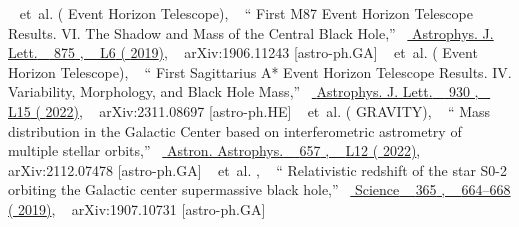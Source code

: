 \documentclass[aps,reprint,superscriptaddress,nofootinbib,floatfix,longbibliography,preprintnumbers]{revtex4-1}
\begin{document}
\begin{thebibliography}{139}
  \BibitemOpen
   { { \  }  et~al.  ( {Event Horizon Telescope}), \  } {\enquote { {{First M87 Event Horizon Telescope Results. VI. The Shadow and Mass of the Central Black Hole}},} \  }\href {\doibase 10.3847/2041-8213/ab1141} { { {Astrophys. J. Lett.} \  }  {875} , \   {L6} ( {2019}{})}, \   {arXiv:1906.11243 [astro-ph.GA]} 
  \BibitemOpen
   { { \  }  et~al.  ( {Event Horizon Telescope}), \  } {\enquote { {{First Sagittarius A* Event Horizon Telescope Results. IV. Variability, Morphology, and Black Hole Mass}},} \  }\href {\doibase 10.3847/2041-8213/ac6736} { { {Astrophys. J. Lett.} \  }  {930} , \   {L15} ( {2022}{})}, \   {arXiv:2311.08697 [astro-ph.HE]} 
  \BibitemOpen
   { {~}  et~al.  ( {GRAVITY}), \  } {\enquote { {{Mass distribution in the Galactic Center based on interferometric astrometry of multiple stellar orbits}},} \  }\href {\doibase 10.1051/0004-6361/202142465} { { {Astron. Astrophys.} \  }  {657} , \   {L12} ( {2022})}, \   {arXiv:2112.07478 [astro-ph.GA]} 
  \BibitemOpen
   { { \  }  et~al. , \  } {\enquote { {{Relativistic redshift of the star S0-2 orbiting the Galactic center supermassive black hole}},} \  }\href {\doibase 10.1126/science.aav8137} { { {Science} \  }  {365} , \   {664--668} ( {2019}{})}, \   {arXiv:1907.10731 [astro-ph.GA]} 

\end{thebibliography}
\end{document}

